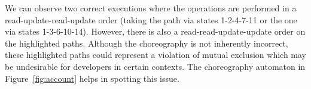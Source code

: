 % 
We can observe two correct executions where the operations are
performed in a read-update-read-update order (taking the path via
states 1-2-4-7-11 or the one via states 1-3-6-10-14).
%
However, there is also a read-read-update-update order on the
highlighted paths.
%
Although the choreography is not inherently incorrect, these
highlighted paths could represent a violation of mutual exclusion
which may be undesirable for developers in certain
contexts.
The choreography automaton in Figure~\ref{fig:account} helps in spotting
this issue.



